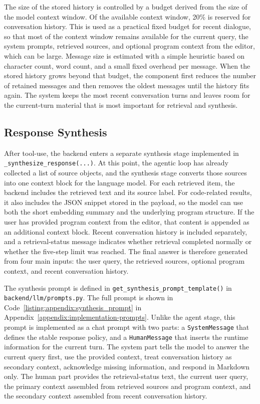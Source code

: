 The size of the stored history is controlled by a budget derived from the size of the model context window. Of the available context window, 20\% is reserved for conversation history. This is used as a practical fixed budget for recent dialogue, so that most of the context window remains available for the current query, the system prompts, retrieved sources, and optional program context from the editor, which can be large. Message size is estimated with a simple heuristic based on character count, word count, and a small fixed overhead per message. When the stored history grows beyond that budget, the component first reduces the number of retained messages and then removes the oldest messages until the history fits again. The system keeps the most recent conversation turns and leaves room for the current-turn material that is most important for retrieval and synthesis.


\subsection{Response Synthesis}
After tool-use, the backend enters a separate synthesis stage implemented in \texttt{\_synthesize\_response(...)}. At this point, the agentic loop has already collected a list of source objects, and the synthesis stage converts those sources into one context block for the language model. For each retrieved item, the backend includes the retrieved text and its source label. For code-related results, it also includes the JSON snippet stored in the payload, so the model can use both the short embedding summary and the underlying program structure. If the user has provided program context from the editor, that content is appended as an additional context block. Recent conversation history is included separately, and a retrieval-status message indicates whether retrieval completed normally or whether the five-step limit was reached. The final answer is therefore generated from four main inputs: the user query, the retrieved sources, optional program context, and recent conversation history.

The synthesis prompt is defined in \texttt{get\_synthesis\_prompt\_template()} in \texttt{backend/llm/prompts.py}. The full prompt is shown in Code~\ref{listing:appendix:synthesis_prompt} in Appendix~\ref{appendix:implementation-prompts}. Unlike the agent stage, this prompt is implemented as a chat prompt with two parts: a \texttt{SystemMessage} that defines the stable response policy, and a \texttt{HumanMessage} that inserts the runtime information for the current turn. The system part tells the model to answer the current query first, use the provided context, treat conversation history as secondary context, acknowledge missing information, and respond in Markdown only. The human part provides the retrieval-status text, the current user query, the primary context assembled from retrieved sources and program context, and the secondary context assembled from recent conversation history.

